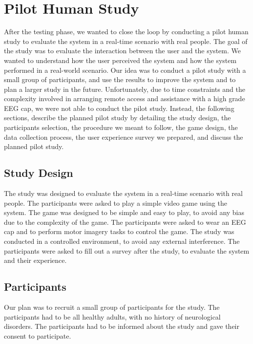 \chapter{Pilot Human Study}\label{ch:human_study}
After the testing phase, we wanted to close the loop by conducting a pilot human study to evaluate the system in a real-time scenario with real people.
The goal of the study was to evaluate the interaction between the user and the system. 
We wanted to understand how the user perceived the system and how the system performed in a real-world scenario. 
Our idea was to conduct a pilot study with a small group of participants, and use the results to improve the system and to plan a larger study in the future.
Unfortunately, due to time constraints and the complexity involved in arranging remote access and assistance with a high grade EEG cap, we were not able to conduct the pilot study.
Instead, the following sections, describe the planned pilot study by detailing the study design, the participants selection, the procedure we meant to follow, the game design, the data collection process, the user experience survey we prepared, and discuss the planned pilot study.


\section{Study Design}
The study was designed to evaluate the system in a real-time scenario with real people.
The participants were asked to play a simple video game using the system.
The game was designed to be simple and easy to play, to avoid any bias due to the complexity of the game.
The participants were asked to wear an EEG cap and to perform motor imagery tasks to control the game.
The study was conducted in a controlled environment, to avoid any external interference.
The participants were asked to fill out a survey after the study, to evaluate the system and their experience.

\section{Participants}
Our plan was to recruit a small group of participants for the study.
The participants had to be all healthy adults, with no history of neurological disorders.
The participants had to be informed about the study and gave their consent to participate.

